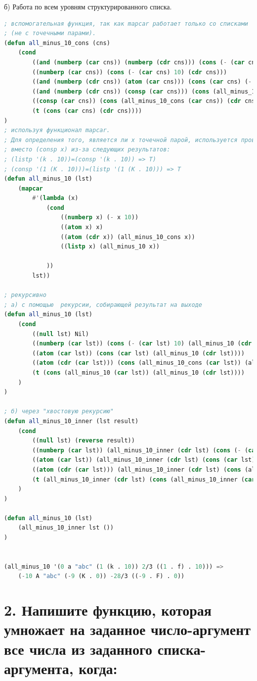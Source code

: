 \documentclass[12pt]{report}
\begin{document}
б) Работа по всем уровням структурированного списка.
\begin{lstlisting}[language=Lisp]
; вспомогательная функция, так как mapcar работает только со списками 
; (не с точечными парами).
(defun all_minus_10_cons (cns)
	(cond 
		((and (numberp (car cns)) (numberp (cdr cns))) (cons (- (car cns) 10) (- (cdr cns) 10)))
		((numberp (car cns)) (cons (- (car cns) 10) (cdr cns)))
		((and (numberp (cdr cns)) (atom (car cns))) (cons (car cns) (- (cdr cns) 10)))
		((and (numberp (cdr cns)) (consp (car cns))) (cons (all_minus_10_cons (car cns)) (- (cdr cns) 10)))
		((consp (car cns)) (cons (all_minus_10_cons (car cns)) (cdr cns)))
		(t (cons (car cns) (cdr cns))))
)
; используя функционал mapcar.
; Для определения того, является ли x точечной парой, используется проверка (atom (cdr x)) 
; вместо (consp x) из-за следующих результатов:
; (listp '(k . 10))=(consp '(k . 10)) => T)
; (consp '(1 (K . 10)))=(listp '(1 (K . 10))) => T
(defun all_minus_10 (lst)
	(mapcar 
		#'(lambda (x) 
			(cond 
				((numberp x) (- x 10))
				((atom x) x)
				((atom (cdr x)) (all_minus_10_cons x))
				((listp x) (all_minus_10 x))
				
			))
		lst))	

; рекурсивно
; а) с помощью  рекурсии, собирающей результат на выходе
(defun all_minus_10 (lst)
	(cond 
		((null lst) Nil)
		((numberp (car lst)) (cons (- (car lst) 10) (all_minus_10 (cdr lst))))
		((atom (car lst)) (cons (car lst) (all_minus_10 (cdr lst))))
		((atom (cdr (car lst))) (cons (all_minus_10_cons (car lst)) (all_minus_10 (cdr lst))))
		(t (cons (all_minus_10 (car lst)) (all_minus_10 (cdr lst))))
	)
)	

; б) через "хвостовую рекурсию" 
(defun all_minus_10_inner (lst result)
	(cond 
		((null lst) (reverse result))
		((numberp (car lst)) (all_minus_10_inner (cdr lst) (cons (- (car lst) 10) result)))
		((atom (car lst)) (all_minus_10_inner (cdr lst) (cons (car lst) result)))
		((atom (cdr (car lst))) (all_minus_10_inner (cdr lst) (cons (all_minus_10_cons (car lst)) result)))
		(t (all_minus_10_inner (cdr lst) (cons (all_minus_10_inner (car lst) ()) result)))
	)
)

(defun all_minus_10 (lst) 
	(all_minus_10_inner lst ())
)


(all_minus_10 '(0 a "abc" (1 (k . 10)) 2/3 ((1 . f) . 10))) => 
	(-10 A "abc" (-9 (K . 0)) -28/3 ((-9 . F) . 0))
\end{lstlisting}



\clearpage
\section*{2. Напишите функцию, которая умножает на заданное число-аргумент все числа из заданного списка-аргумента, когда:}
\end{document}
